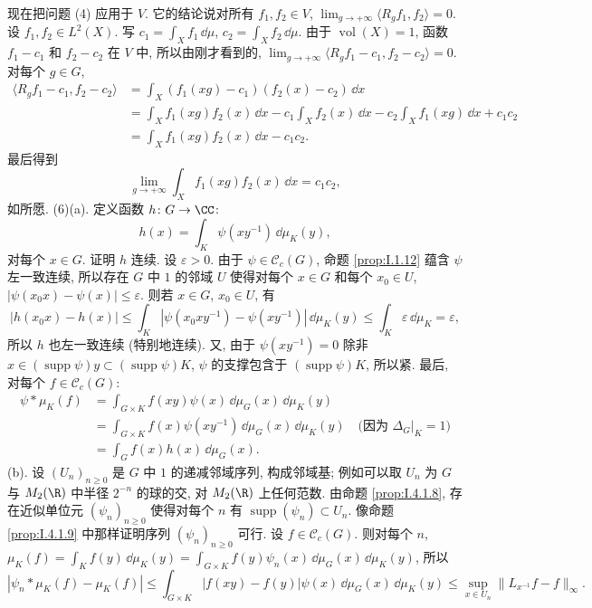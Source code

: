 \begin{solution}
现在把问题 (4) 应用于 $V$. 它的结论说对所有 $f_1, f_2 \in V$, $\lim_{g \to +\infty}\langle R_gf_1, f_2 \rangle = 0$.
设 $f_1, f_2 \in L^2(X)$. 写 $c_1 = \int_X f_1\,\dd\mu$, $c_2 = \int_X f_2\,\dd\mu$. 由于 $\operatorname{vol}(X) = 1$, 函数 $f_1 - c_1$ 和 $f_2 - c_2$ 在 $V$ 中, 所以由刚才看到的, $\lim_{g \to +\infty}\langle R_gf_1 - c_1, f_2 - c_2 \rangle = 0$.
对每个 $g \in G$,
\begin{align*}
\langle R_gf_1 - c_1, f_2 - c_2 \rangle &= \int_X (f_1(xg) - c_1)(f_2(x) - c_2)\,\dd x \\
&= \int_X f_1(xg)f_2(x)\,\dd x - c_1\int_X f_2(x)\,\dd x - c_2\int_X f_1(xg)\,\dd x + c_1c_2 \\
&= \int_X f_1(xg)f_2(x)\,\dd x - c_1c_2.
\end{align*}
最后得到
\[
\lim_{g \to +\infty}\int_X f_1(xg)f_2(x)\,\dd x = c_1c_2,
\]
如所愿.
(6)(a). 定义函数 $h \colon G \to \CC$:
\[
h(x) = \int_K\psi(xy^{-1})\,\dd\mu_K(y),
\]
对每个 $x \in G$. 证明 $h$ 连续. 设 $\varepsilon > 0$. 由于 $\psi \in \mathcal{C}_c(G)$, 命题 \ref{prop:I.1.12} 蕴含 $\psi$ 左一致连续, 所以存在 $G$ 中 $1$ 的邻域 $U$ 使得对每个 $x \in G$ 和每个 $x_0 \in U$, $|\psi(x_0x) - \psi(x)| \leq \varepsilon$. 则若 $x \in G$, $x_0 \in U$, 有
\[
|h(x_0x) - h(x)| \leq \int_K|\psi(x_0xy^{-1}) - \psi(xy^{-1})|\,\dd\mu_K(y) \leq \int_K\varepsilon\,\dd\mu_K = \varepsilon,
\]
所以 $h$ 也左一致连续 (特别地连续). 又, 由于 $\psi(xy^{-1}) = 0$ 除非 $x \in (\operatorname{supp}\psi)y \subset (\operatorname{supp}\psi)K$, $\psi$ 的支撑包含于 $(\operatorname{supp}\psi)K$, 所以紧.
最后, 对每个 $f \in \mathcal{C}_c(G)$:
\begin{align*}
\psi * \mu_K(f) &= \int_{G \times K}f(xy)\psi(x)\,\dd\mu_G(x)\,\dd\mu_K(y) \\
&= \int_{G \times K}f(x)\psi(xy^{-1})\,\dd\mu_G(x)\,\dd\mu_K(y) \quad \text{(因为 } \Delta_G|_K = 1\text{)} \\
&= \int_G f(x)h(x)\,\dd\mu_G(x).
\end{align*}
(b). 设 $(U_n)_{n \geq 0}$ 是 $G$ 中 $1$ 的递减邻域序列, 构成邻域基; 例如可以取 $U_n$ 为 $G$ 与 $M_2(\R)$ 中半径 $2^{-n}$ 的球的交, 对 $M_2(\R)$ 上任何范数. 由命题 \ref{prop:I.4.1.8}, 存在近似单位元 $(\psi_n)_{n \geq 0}$ 使得对每个 $n$ 有 $\operatorname{supp}(\psi_n) \subset U_n$.
像命题 \ref{prop:I.4.1.9} 中那样证明序列 $(\psi_n)_{n \geq 0}$ 可行. 设 $f \in \mathcal{C}_c(G)$. 则对每个 $n$, $\mu_K(f) = \int_K f(y)\,\dd\mu_K(y) = \int_{G \times K}f(y)\psi_n(x)\,\dd\mu_G(x)\,\dd\mu_K(y)$, 所以
\[
|\psi_n * \mu_K(f) - \mu_K(f)| \leq \int_{G \times K}|f(xy) - f(y)|\psi(x)\,\dd\mu_G(x)\,\dd\mu_K(y) \leq \sup_{x \in U_n}\|L_{x^{-1}}f - f\|_{\infty}.
\]
\end{solution}
